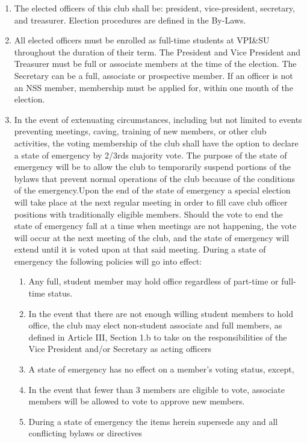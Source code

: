 \documentclass[
]{article}
\providecommand{\tightlist}{%
  \setlength{\itemsep}{0pt}\setlength{\parskip}{0pt}}
\begin{document}
\begin{enumerate}
\def\labelenumi{\arabic{enumi}.}
\tightlist
\item
  The elected officers of this club shall be: president, vice-president,
  secretary, and treasurer. Election procedures are defined in the
  By-Laws.
\item
  All elected officers must be enrolled as full-time students at VPI\&SU
  throughout the duration of their term. The President and Vice
  President and Treasurer must be full or associate members at the time
  of the election. The Secretary can be a full, associate or prospective
  member. If an officer is not an NSS member, membership must be applied
  for, within one month of the election.
\item
  In the event of extenuating circumstances, including but not limited
  to events preventing meetings, caving, training of new members, or
  other club activities, the voting membership of the club shall have
  the option to declare a state of emergency by 2/3rds majority vote.
  The purpose of the state of emergency will be to allow the club to
  temporarily suspend portions of the bylaws that prevent normal
  operations of the club because of the conditions of the emergency.Upon
  the end of the state of emergency a special election will take place
  at the next regular meeting in order to fill cave club officer
  positions with traditionally eligible members. Should the vote to end
  the state of emergency fall at a time when meetings are not happening,
  the vote will occur at the next meeting of the club, and the state of
  emergency will extend until it is voted upon at that said meeting.
  During a state of emergency the following policies will go into
  effect:

  \begin{enumerate}
  \def\labelenumii{\Alph{enumii}.}
  \tightlist
  \item
    Any full, student member may hold office regardless of part-time or
    full-time status.
  \item
    In the event that there are not enough willing student members to
    hold office, the club may elect non-student associate and full
    members, as defined in Article III, Section 1.b to take on the
    responsibilities of the Vice President and/or Secretary as acting
    officers
  \item
    A state of emergency has no effect on a member's voting status,
    except,
  \item
    In the event that fewer than 3 members are eligible to vote,
    associate members will be allowed to vote to approve new members.
  \item
    During a state of emergency the items herein supersede any and all
    conflicting bylaws or directives
  \end{enumerate}
\end{enumerate}
\end{document}
